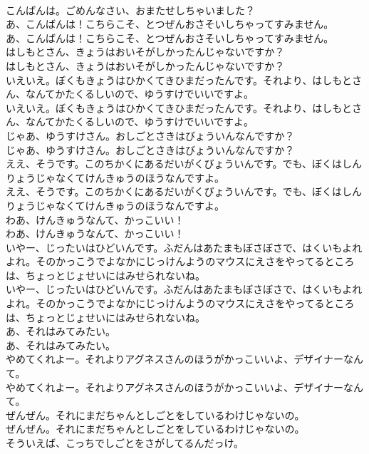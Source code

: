 \documentclass[8pt]{extreport}
\begin{document}
\begin{CJK}{UTF8}{min}
\\	こんばんは。ごめんなさい、おまたせしちゃいました？
\\	あ、こんばんは！こちらこそ、とつぜんおさそいしちゃってすみません。
\\	あ、こんばんは！こちらこそ、とつぜんおさそいしちゃってすみません。
\\	はしもとさん、きょうはおいそがしかったんじゃないですか？
\\	はしもとさん、きょうはおいそがしかったんじゃないですか？
\\	いえいえ。ぼくもきょうはひかくてきひまだったんです。それより、はしもとさん、なんてかたくるしいので、ゆうすけでいいですよ。
\\	いえいえ。ぼくもきょうはひかくてきひまだったんです。それより、はしもとさん、なんてかたくるしいので、ゆうすけでいいですよ。
\\	じゃあ、ゆうすけさん。おしごとさきはびょういんなんですか？
\\	じゃあ、ゆうすけさん。おしごとさきはびょういんなんですか？
\\	ええ、そうです。このちかくにあるだいがくびょういんです。でも、ぼくはしんりょうじゃなくてけんきゅうのほうなんですよ。
\\	ええ、そうです。このちかくにあるだいがくびょういんです。でも、ぼくはしんりょうじゃなくてけんきゅうのほうなんですよ。
\\	わあ、けんきゅうなんて、かっこいい！
\\	わあ、けんきゅうなんて、かっこいい！
\\	いやー、じったいはひどいんです。ふだんはあたまもぼさぼさで、はくいもよれよれ。そのかっこうでよなかにじっけんようのマウスにえさをやってるところは、ちょっとじょせいにはみせられないね。
\\	いやー、じったいはひどいんです。ふだんはあたまもぼさぼさで、はくいもよれよれ。そのかっこうでよなかにじっけんようのマウスにえさをやってるところは、ちょっとじょせいにはみせられないね。
\\	あ、それはみてみたい。
\\	あ、それはみてみたい。
\\	やめてくれよー。それよりアグネスさんのほうがかっこいいよ、デザイナーなんて。
\\	やめてくれよー。それよりアグネスさんのほうがかっこいいよ、デザイナーなんて。
\\	ぜんぜん。それにまだちゃんとしごとをしているわけじゃないの。
\\	ぜんぜん。それにまだちゃんとしごとをしているわけじゃないの。
\\	そういえば、こっちでしごとをさがしてるんだっけ。

\end{CJK}
\end{document}
